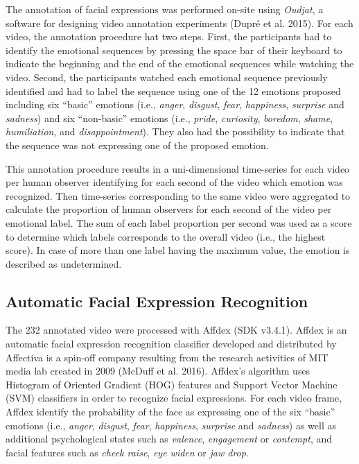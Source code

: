 \documentclass[conference,final,]{IEEEtran}
\begin{document}
The annotation of facial expressions was performed on-site using
\emph{Oudjat}, a software for designing video annotation experiments
(Dupré et al. 2015). For each video, the annotation procedure hat two
steps. First, the participants had to identify the emotional sequences
by pressing the space bar of their keyboard to indicate the beginning
and the end of the emotional sequences while watching the video. Second,
the participants watched each emotional sequence previously identified
and had to label the sequence using one of the 12 emotions proposed
including six ``basic'' emotions (i.e., \emph{anger}, \emph{disgust},
\emph{fear}, \emph{happiness}, \emph{surprise} and \emph{sadness}) and
six ``non-basic'' emotions (i.e., \emph{pride}, \emph{curiosity},
\emph{boredom}, \emph{shame}, \emph{humiliation}, and
\emph{disappointment}). They also had the possibility to indicate that
the sequence was not expressing one of the proposed emotion.

This annotation procedure results in a uni-dimensional time-series for
each video per human observer identifying for each second of the video
which emotion was recognized. Then time-series corresponding to the same
video were aggregated to calculate the proportion of human observers for
each second of the video per emotional label. The sum of each label
proportion per second was used as a score to determine which labels
corresponds to the overall video (i.e., the highest score). In case of
more than one label having the maximum value, the emotion is described
as undetermined.

\hypertarget{automatic-facial-expression-recognition}{%
\subsection{Automatic Facial Expression
Recognition}\label{automatic-facial-expression-recognition}}

The 232 annotated video were processed with Affdex (SDK v3.4.1). Affdex
is an automatic facial expression recognition classifier developed and
distributed by Affectiva is a spin-off company resulting from the
research activities of MIT media lab created in 2009 (McDuff et al.
2016). Affdex's algorithm uses Histogram of Oriented Gradient (HOG)
features and Support Vector Machine (SVM) classifiers in order to
recognize facial expressions. For each video frame, Affdex identify the
probability of the face as expressing one of the six ``basic'' emotions
(i.e., \emph{anger}, \emph{disgust}, \emph{fear}, \emph{happiness},
\emph{surprise} and \emph{sadness}) as well as additional psychological
states such as \emph{valence}, \emph{engagement} or \emph{contempt}, and
facial features such as \emph{cheek raise}, \emph{eye widen} or
\emph{jaw drop}.
\end{document}
